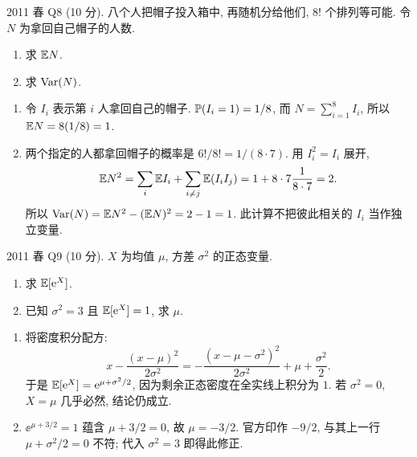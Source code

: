 \begin{exercise}\label{ex:fe2011q8}
2011 春 Q8 (10 分). 八个人把帽子投入箱中, 再随机分给他们, $8!$ 个排列等可能. 令 $N$ 为拿回自己帽子的人数.
\begin{enumerate}[label=(\alph*)]
\item\label{ex:fe2011q8-a} 求 $\mathbb E N$.
\item\label{ex:fe2011q8-b} 求 $\operatorname{Var}(N)$.
\end{enumerate}
\end{exercise}
\begin{solution}
\begin{enumerate}[label=(\alph*)]
\item\label{sol:fe2011q8-a} 令 $I_i$ 表示第 $i$ 人拿回自己的帽子. $\mathbb P(I_i=1)=1/8$, 而 $N=\sum_{i=1}^8I_i$, 所以 $\mathbb E N=8(1/8)=1$.
\item\label{sol:fe2011q8-b} 两个指定的人都拿回帽子的概率是 $6!/8!=1/(8\cdot7)$. 用 $I_i^2=I_i$ 展开,
\[
 \mathbb E N^2=\sum_i\mathbb E I_i+\sum_{i\ne j}\mathbb E(I_iI_j)
 =1+8\cdot7\frac1{8\cdot7}=2.
\]
所以 $\operatorname{Var}(N)=\mathbb E N^2-(\mathbb E N)^2=2-1=1$. 此计算不把彼此相关的 $I_i$ 当作独立变量.
\end{enumerate}
\end{solution}

\begin{exercise}\label{ex:fe2011q9}
2011 春 Q9 (10 分). $X$ 为均值 $\mu$, 方差 $\sigma^2$ 的正态变量.
\begin{enumerate}[label=(\alph*)]
\item\label{ex:fe2011q9-a} 求 $\mathbb E[\mathrm e^X]$.
\item\label{ex:fe2011q9-b} 已知 $\sigma^2=3$ 且 $\mathbb E[\mathrm e^X]=1$, 求 $\mu$.
\end{enumerate}
\end{exercise}
\begin{solution}
\begin{enumerate}[label=(\alph*)]
\item\label{sol:fe2011q9-a} 将密度积分配方:
\[
 x-\frac{(x-\mu)^2}{2\sigma^2}
 =-\frac{(x-\mu-\sigma^2)^2}{2\sigma^2}+\mu+\frac{\sigma^2}{2}.
\]
于是 $\mathbb E[\mathrm e^X]=\mathrm e^{\mu+\sigma^2/2}$, 因为剩余正态密度在全实线上积分为 $1$. 若 $\sigma^2=0$, $X=\mu$ 几乎必然, 结论仍成立.
\item\label{sol:fe2011q9-b} $\ee^{\mu+3/2}=1$ 蕴含 $\mu+3/2=0$, 故 $\mu=-3/2$. 官方印作 $-9/2$, 与其上一行 $\mu+\sigma^2/2=0$ 不符; 代入 $\sigma^2=3$ 即得此修正.
\end{enumerate}
\end{solution}

